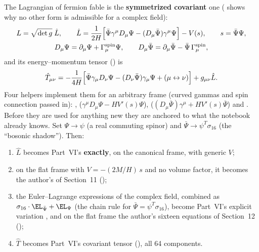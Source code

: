 The Lagrangian of fermion fable is the \textbf{symmetrized covariant} one ( shows why
no other form is admissible for a complex field):
\begin{gather*}
  L=\sqrt{\det g}\;\hat L,\qquad
  \hat L=\frac{1}{2H}\Bigl[\bar\Psi\gamma^\mu D_\mu\Psi-(D_\mu\bar\Psi)\gamma^\mu\Psi\Bigr]-V(s),\qquad s=\bar\Psi\Psi,\\
  D_\mu\Psi=\partial_\mu\Psi+\Gamma^{\mathrm{spin}}_\mu\Psi,\qquad
  D_\mu\bar\Psi=\partial_\mu\bar\Psi-\bar\Psi\,\Gamma^{\mathrm{spin}}_\mu ,
\end{gather*}
and its energy--momentum tensor () is
\[
  \hat T_{\mu\nu}=-\frac{1}{4H}\Bigl[\bar\Psi\gamma_\mu D_\nu\Psi-(D_\nu\bar\Psi)\gamma_\mu\Psi+(\mu\leftrightarrow\nu)\Bigr]+g_{\mu\nu}\hat L .
\]
Four helpers implement them for an arbitrary frame (curved gammas and spin connection passed in):
,  ($\gamma^\mu D_\mu\Psi-HV'(s)\Psi$),
 ($(D_\mu\bar\Psi)\gamma^\mu+HV'(s)\bar\Psi$) and
. Before they are used for anything new they are anchored to what the notebook
already knows. Set $\Psi\to\psi$ (a real commuting spinor) and $\bar\Psi\to\psi^{T}\sigma_{16}$ (the
``bosonic shadow''). Then:
\begin{enumerate}
  \item $\hat L$ becomes Part~VI's  \textbf{exactly}, on the canonical frame,
        with generic $V$;
  \item on the flat frame with $V=-(2M/H)\,s$ and no volume factor, it becomes the author's
         of Section~11 ();
  \item the Euler--Lagrange expressions of the complex field, combined as
        $\sigma_{16}\cdot\EL_{\bar\Psi}+\EL_{\Psi}$ (the chain rule for
        $\bar\Psi=\psi^{T}\sigma_{16}$), become Part~VI's explicit variation ,
        and on the flat frame the author's sixteen equations  of Section~12
        ();
  \item $\hat T$ becomes Part~VI's covariant tensor  (), all 64
        components.
\end{enumerate}
